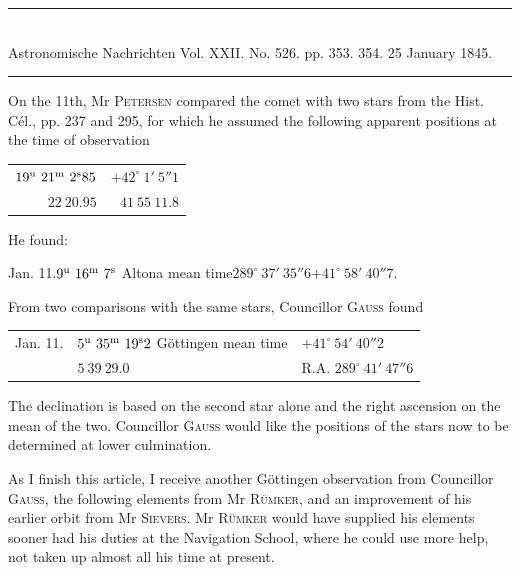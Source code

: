 \clearpage
\hypertarget{native-475-lower}{}
\begin{center}
\rule{0.55\linewidth}{0.4pt}\\[2pt]
Astronomische Nachrichten Vol. XXII. No. 526. pp. 353. 354. 25 January 1845.\\[2pt]
\rule{0.55\linewidth}{0.4pt}
\end{center}

On the 11th, Mr \textsc{Petersen} compared the comet with two stars from the Hist. Cél., pp. 237 and 295, for which he assumed the following apparent positions at the time of observation

\begin{center}
\begin{tabular}{rr}
$19^{\rm u}\ 21^{\rm m}\ 2^{\rm s}85$ & $+42^\circ\ 1'\ 5''1$ \\
$22\ 20.95$ & $41\ 55\ 11.8$ \\
\end{tabular}
\end{center}
\noindent He found:

\begin{center}
Jan. 11.\quad $9^{\rm u}\ 16^{\rm m}\ 7^{\rm s}$ Altona mean time\quad $289^\circ\ 37'\ 35''6$\quad $+41^\circ\ 58'\ 40''7$.
\end{center}

From two comparisons with the same stars, Councillor \textsc{Gauss} found

\begin{center}
\begin{tabular}{lll}
Jan. 11. & $5^{\rm u}\ 35^{\rm m}\ 19^{\rm s}2$ Göttingen mean time & $+41^\circ\ 54'\ 40''2$ \\
 & $5\ 39\ 29.0$ & R.A. $289^\circ\ 41'\ 47''6$ \\
\end{tabular}
\end{center}

The declination is based on the second star alone and the right ascension on the mean of the two. Councillor \textsc{Gauss} would like the positions of the stars now to be determined at lower culmination.

As I finish this article, I receive another Göttingen observation from Councillor \textsc{Gauss}, the following elements from Mr \textsc{Rümker}, and an improvement of his earlier orbit from Mr \textsc{Sievers}. Mr \textsc{Rümker} would have supplied his elements sooner had his duties at the Navigation School, where he could use more help, not taken up almost all his time at present.

